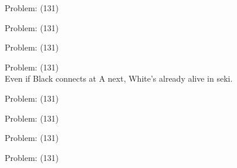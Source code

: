 \documentclass[11pt]{article}
\begin{document}
\begin{minipage}[t]{0.5\textwidth}
  {\centering
  
  Problem: (131)\\
  
  }
\end{minipage}
\begin{minipage}[t]{0.5\textwidth}
  {\centering
  
  Problem: (131)\\
  
  }
\end{minipage}
\begin{minipage}[t]{0.5\textwidth}
  {\centering
  
  Problem: (131)\\
  
  }
\end{minipage}
\begin{minipage}[t]{0.5\textwidth}
  {\centering
  
  Problem: (131)\\
  Even if Black connects at A next, White's already alive in seki.\\
  }
\end{minipage}
\begin{minipage}[t]{0.5\textwidth}
  {\centering
  
  Problem: (131)\\
  
  }
\end{minipage}
\begin{minipage}[t]{0.5\textwidth}
  {\centering
  
  Problem: (131)\\
  
  }
\end{minipage}
\begin{minipage}[t]{0.5\textwidth}
  {\centering
  
  Problem: (131)\\
  
  }
\end{minipage}
\begin{minipage}[t]{0.5\textwidth}
  {\centering
  
  Problem: (131)\\
  
  }
\end{minipage}
\end{document}
